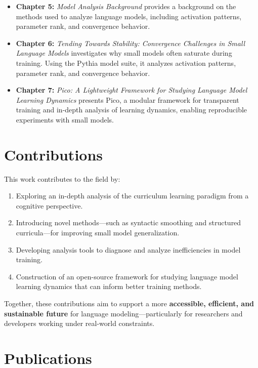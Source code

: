 \begin{itemize}
    \item \textbf{Chapter 5:} \emph{Model Analysis Background} provides a background on the methods used to analyze language models, including activation patterns, parameter rank, and convergence behavior.

    \item \textbf{Chapter 6:} \emph{Tending Towards Stability: Convergence Challenges in Small Language Models}  
    investigates why small models often saturate during training. Using the Pythia model suite, it analyzes activation patterns, parameter rank, and convergence behavior.

    \item \textbf{Chapter 7:} \emph{Pico: A Lightweight Framework for Studying Language Model Learning Dynamics}  
    presents Pico, a modular framework for transparent training and in-depth analysis of learning dynamics, enabling reproducible experiments with small models.
\end{itemize}

\section*{Contributions}

This work contributes to the field by:

\begin{enumerate}
    \item Exploring an in-depth analysis of the curriculum learning paradigm from a cognitive perspective.

    \item Introducing novel methods—such as syntactic smoothing and structured curricula—for improving small model generalization.

    \item Developing analysis tools to diagnose and analyze inefficiencies in model training.

    \item Construction of an open-source framework for studying language model learning dynamics that can inform better training methods.
\end{enumerate}

Together, these contributions aim to support a more \textbf{accessible, efficient, and sustainable future} for language modeling—particularly for researchers and developers working under real-world constraints.

\section*{Publications}

